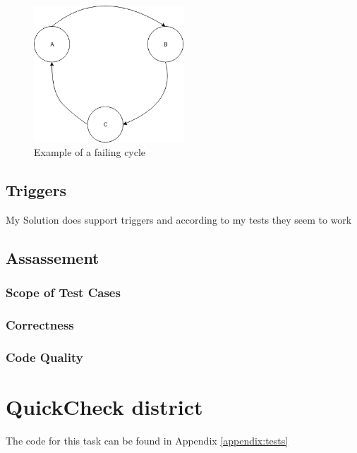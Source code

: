 \documentclass[11pt,a4paper]{article}
\begin{document}
\begin{figure}[!htb]
	\center
	\includegraphics[width=0.5\textwidth]{images/fail_cycle}
	\caption{Example of a failing cycle}
\end{figure}

\subsection{Triggers}
My Solution does support triggers and according to my tests they seem to work 

\subsection{Assassement}

\subsubsection{Scope of Test Cases}
\subsubsection{Correctness}
\subsubsection{Code Quality}
\section{QuickCheck district}
The code for this task can be found in Appendix \ref{appendix:tests}
\end{document}
